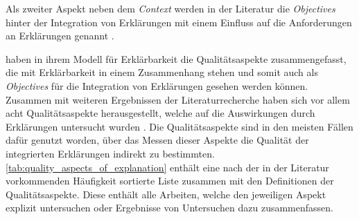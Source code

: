 Als zweiter Aspekt neben dem \textit{Context} werden in der Literatur die \textit{Objectives} hinter der Integration von Erklärungen mit einem Einfluss auf die Anforderungen an Erklärungen genannt \cite{rosenfeld_explainability_2019, nunes_systematic_2017}.

\citeauthor{chazette_knowledge_nodate} haben in ihrem Modell für Erklärbarkeit die Qualitätsaspekte zusammengefasst, die mit Erklärbarkeit in einem Zusammenhang stehen und somit auch als \textit{Objectives} für die Integration von Erklärungen gesehen werden können. Zusammen mit weiteren Ergebnissen der Literaturrecherche haben sich vor allem acht Qualitätsaspekte herausgestellt, welche auf die Auswirkungen durch Erklärungen untersucht wurden \cite{nunes_systematic_2017, tintarev2007survey}. Die Qualitätsaspekte sind in den meisten Fällen dafür genutzt worden, über das Messen dieser Aspekte die Qualität der integrierten Erklärungen indirekt zu bestimmten. \autoref{tab:quality_aspects_of_explanation} enthält eine nach der in der Literatur vorkommenden Häufigkeit sortierte Liste zusammen mit den Definitionen der Qualitätsaspekte. Diese enthält alle Arbeiten, welche den jeweiligen Aspekt explizit untersuchen oder Ergebnisse von Untersuchen dazu zusammenfassen.

